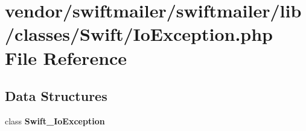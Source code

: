 \section{vendor/swiftmailer/swiftmailer/lib/classes/\+Swift/\+Io\+Exception.php File Reference}
\label{swiftmailer_2swiftmailer_2lib_2classes_2_swift_2_io_exception_8php}
\subsection*{Data Structures}
\begin{DoxyCompactItemize}
\item 
class {\bf Swift\+\_\+\+Io\+Exception}
\end{DoxyCompactItemize}
